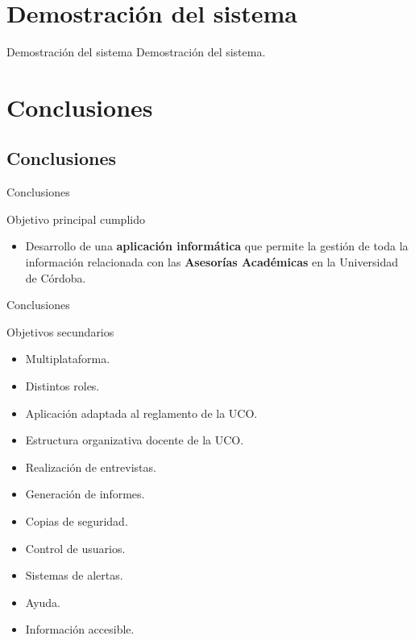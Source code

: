 \documentclass[10pt, hyperref={pdfpagelabels=false}]{beamer}
\begin{document}
  \section{Demostración del sistema}
    \begin{frame}{Demostración del sistema}
      Demostración del sistema.
    \end{frame}


  \section{Conclusiones}
    \subsection{Conclusiones}
      \begin{frame}{Conclusiones}
        \begin{block}{Objetivo principal cumplido}
          \begin{itemize}
            \item Desarrollo de una \textbf{aplicación informática} que permite
            la gestión de toda la información relacionada con las
            \textbf{Asesorías Académicas} en la Universidad de Córdoba.
          \end{itemize}
        \end{block}
      \end{frame}

      \begin{frame}{Conclusiones}
        \begin{block}{Objetivos secundarios}
          \begin{itemize}
            \item Multiplataforma.
            \item Distintos roles.
            \item Aplicación adaptada al reglamento de la UCO.
            \item Estructura organizativa docente de la UCO.
            \item Realización de entrevistas.
            \item Generación de informes.
            \item Copias de seguridad.
            \item Control de usuarios.
            \item Sistemas de alertas.
            \item Ayuda.
            \item Información accesible.
          \end{itemize}
        \end{block}
      \end{frame}
\end{document}
